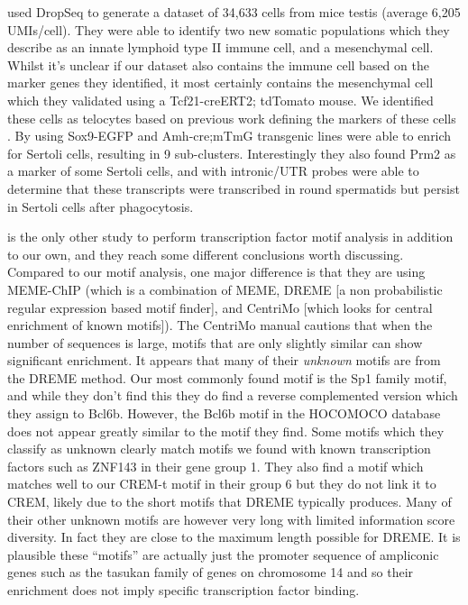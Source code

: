 \cite{Green2018Comprehensive} used DropSeq to generate a dataset of 34,633 cells from mice testis (average 6,205 UMIs/cell). They were able to identify two new somatic populations which they describe as an innate lymphoid type II immune cell, and a mesenchymal cell. Whilst it's unclear if our dataset also contains the immune cell based on the marker genes they identified, it most certainly contains the mesenchymal cell which they validated using a Tcf21-creERT2; tdTomato mouse. We identified these cells as telocytes based on previous work defining the markers of these cells \parencite{Marini2018Reappraising}. By using Sox9-EGFP and Amh-cre;mTmG transgenic lines \cite{Green2018Comprehensive} were able to enrich for Sertoli cells, resulting in 9 sub-clusters. Interestingly they also found Prm2 as a marker of some Sertoli cells, and with intronic/UTR probes were able to determine that these transcripts were transcribed in round spermatids but persist in Sertoli cells after phagocytosis.

\cite{Green2018Comprehensive} is the only other study to perform transcription factor motif analysis in addition to our own, and they reach some different conclusions worth discussing. Compared to our motif analysis, one major difference is that they are using MEME-ChIP (which is a combination of MEME, DREME [a non probabilistic regular expression based motif finder], and CentriMo [which looks for central enrichment of known motifs]). The CentriMo manual cautions that when the number of sequences is large, motifs that are only slightly similar can show significant enrichment. It appears that many of their \emph{unknown} motifs are from the DREME method.  Our most commonly found motif is the Sp1 family motif, and while they don't find this they do find a reverse complemented version which they assign to Bcl6b. However, the Bcl6b motif in the HOCOMOCO database does not appear greatly similar to the motif they find. Some motifs which they classify as unknown clearly match motifs we found with known transcription factors such as ZNF143 in their gene group 1. They also find a motif which matches well to our CREM-t motif in their group 6 but they do not link it to CREM, likely due to the short motifs that DREME typically produces. Many of their other unknown motifs are however very long with limited information score diversity. In fact they are close to the maximum length possible for DREME. It is plausible these ``motifs'' are actually just the promoter sequence of ampliconic genes such as the tasukan family of genes on chromosome 14 and so their enrichment does not imply specific transcription factor binding.

